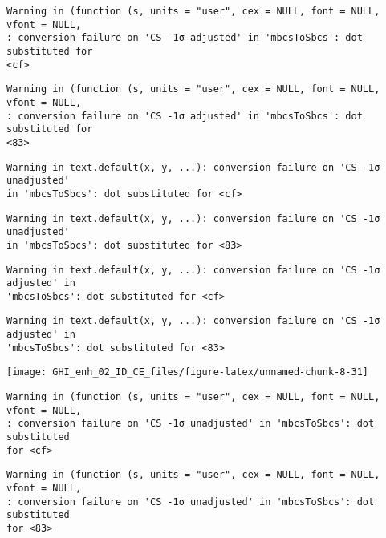\documentclass[
  10pt,
  a4paper,oneside]{article}
\begin{document}
\begin{verbatim}
Warning in (function (s, units = "user", cex = NULL, font = NULL, vfont = NULL,
: conversion failure on 'CS -1σ adjusted' in 'mbcsToSbcs': dot substituted for
<cf>
\end{verbatim}

\begin{verbatim}
Warning in (function (s, units = "user", cex = NULL, font = NULL, vfont = NULL,
: conversion failure on 'CS -1σ adjusted' in 'mbcsToSbcs': dot substituted for
<83>
\end{verbatim}

\begin{verbatim}
Warning in text.default(x, y, ...): conversion failure on 'CS -1σ unadjusted'
in 'mbcsToSbcs': dot substituted for <cf>
\end{verbatim}

\begin{verbatim}
Warning in text.default(x, y, ...): conversion failure on 'CS -1σ unadjusted'
in 'mbcsToSbcs': dot substituted for <83>
\end{verbatim}

\begin{verbatim}
Warning in text.default(x, y, ...): conversion failure on 'CS -1σ adjusted' in
'mbcsToSbcs': dot substituted for <cf>
\end{verbatim}

\begin{verbatim}
Warning in text.default(x, y, ...): conversion failure on 'CS -1σ adjusted' in
'mbcsToSbcs': dot substituted for <83>
\end{verbatim}

\begin{center}\texttt{[image: GHI\_enh\_02\_ID\_CE\_files/figure-latex/unnamed-chunk-8-31]} \end{center}

\begin{verbatim}
Warning in (function (s, units = "user", cex = NULL, font = NULL, vfont = NULL,
: conversion failure on 'CS -1σ unadjusted' in 'mbcsToSbcs': dot substituted
for <cf>
\end{verbatim}

\begin{verbatim}
Warning in (function (s, units = "user", cex = NULL, font = NULL, vfont = NULL,
: conversion failure on 'CS -1σ unadjusted' in 'mbcsToSbcs': dot substituted
for <83>
\end{verbatim}
\end{document}
